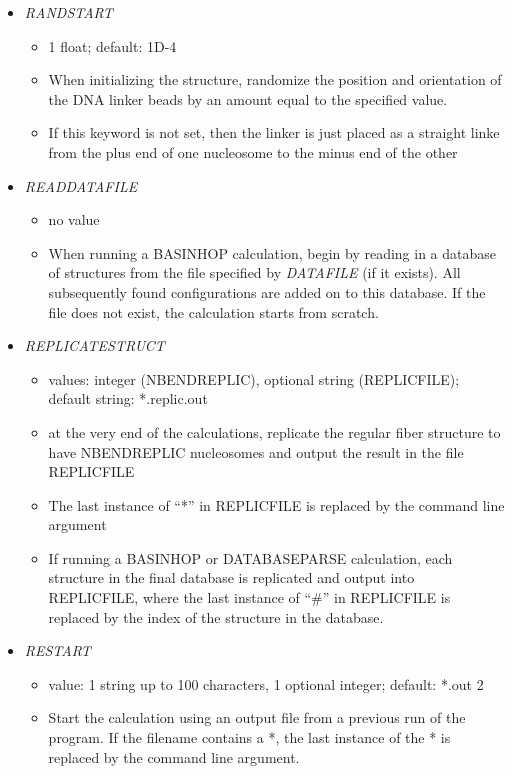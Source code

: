 \documentclass[12pt,dvips]{article}
\begin{document}
\begin{itemize}
\begin{itemize}
  \end{itemize}
%
\item {\it RANDSTART}
  \begin{itemize}
    \item 1 float; default: 1D-4
    \item When initializing the structure, randomize the position and orientation of the DNA linker beads by an amount equal to the specified value.
    \item If this keyword is not set, then the linker is just placed as a straight linke from the plus end of one nucleosome to the minus end of the other
  \end{itemize}
%
\item {\it READDATAFILE}
  \begin{itemize}
    \item no value
    \item When running a BASINHOP calculation, begin by reading in a database of structures from the file specified by {\em DATAFILE} (if it exists). All subsequently found configurations are added on to this database. If the file does not exist, the calculation starts from scratch.
  \end{itemize}
%
\item {\it REPLICATESTRUCT}
  \begin{itemize}
    \item values: integer (NBENDREPLIC), optional string (REPLICFILE); default string: *.replic.out
    \item at the very end of the calculations, replicate the regular fiber structure to have NBENDREPLIC nucleosomes and output the result in the file REPLICFILE
    \item The last instance of ``*'' in REPLICFILE is replaced by the command line argument
    \item If running a BASINHOP or DATABASEPARSE calculation, each structure in the final database is replicated and output into REPLICFILE, where the last instance of ``\#'' in REPLICFILE is replaced by the index of the structure in the database.
  \end{itemize}
%
\item {\it RESTART}
  \begin{itemize}
    \item value: 1 string up to 100 characters, 1 optional integer; default: *.out 2
    \item Start the calculation using an output file from a previous run of the program. If the filename contains a *, the last instance of the * is replaced by the command line argument. 

\end{itemize}
\end{itemize}
\end{document}
